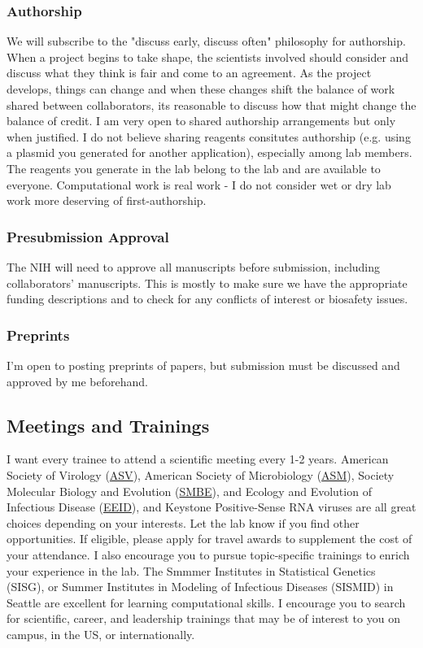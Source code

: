 \documentclass[10pt, letterpaper, twocolumn]{article} %
\begin{document}
\subsubsection{Authorship}
We will subscribe to the "discuss early, discuss often" philosophy for authorship. When a project begins to take shape, the scientists involved should consider and discuss what they think is fair and come to an agreement. As the project develops, things can change and when these changes shift the balance of work shared between collaborators, its reasonable to discuss how that might change the balance of credit. I am very open to shared authorship arrangements but only when justified. I do not believe sharing reagents consitutes authorship (e.g. using a plasmid you generated for another application), especially among lab members. The reagents you generate in the lab belong to the lab and are available to everyone. Computational work is real work - I do not consider wet or dry lab work more deserving of first-authorship.

\subsubsection{Presubmission Approval}
The NIH will need to approve all manuscripts before submission, including collaborators' manuscripts. This is mostly to make sure we have the appropriate funding descriptions and to check for any conflicts of interest or biosafety issues.

\subsubsection{Preprints}
I'm open to posting preprints of papers, but submission must be discussed and approved by me beforehand.

\subsection{Meetings and Trainings}
I want every trainee to attend a scientific meeting every 1-2 years. American Society of Virology (\href{https://asv.org/}{ASV}), American Society of Microbiology (\href{https://asm.org/}{ASM}), Society Molecular Biology and Evolution (\href{https://smbe.org/smbe/}{SMBE}), and Ecology and Evolution of Infectious Disease (\href{https://www.eeidconference2021.org/}{EEID}), and Keystone Positive-Sense RNA viruses are all great choices depending on your interests. Let the lab know if you find other opportunities. If eligible, please apply for travel awards to supplement the cost of your attendance.\newline
I also encourage you to pursue topic-specific trainings to enrich your experience in the lab. The Smmmer Institutes in Statistical Genetics (SISG), or Summer Institutes in Modeling of Infectious Diseases (SISMID) in Seattle are excellent for learning computational skills. I encourage you to search for scientific, career, and leadership trainings that may be of interest to you on campus, in the US, or internationally.
\end{document}
